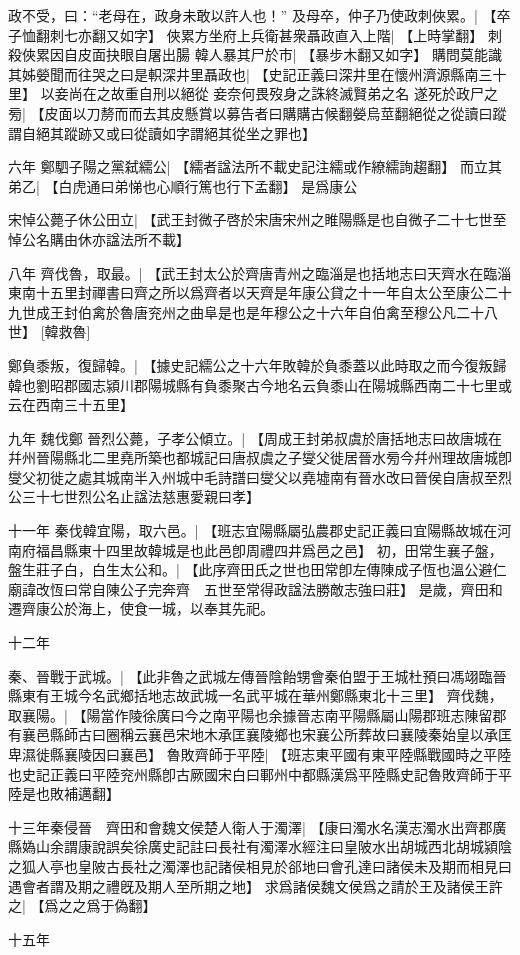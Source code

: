 政不受，曰：“老母在，政身未敢以許人也！”
及母卒，仲子乃使政刺俠累。|{
	【卒子恤翻刺七亦翻又如字】}
俠累方坐府上兵衛甚衆聶政直入上階|{
	【上時掌翻】}
刺殺俠累因自皮面抉眼自屠出腸
韓人暴其尸於市|{
	【暴步木翻又如字】}
購問莫能識
其姊嫈聞而往哭之曰是軹深井里聶政也|{
	【史記正義曰深井里在懷州濟源縣南三十里】}
以妾尚在之故重自刑以絕從
妾奈何畏歿身之誅終滅賢弟之名
遂死於政尸之㫄|{
	【皮面以刀剺而而去其皮懸賞以募告者曰購購古候翻嫈烏莖翻絕從之從讀曰蹤謂自絕其蹤跡又或曰從讀如字謂絕其從坐之罪也】
	}
\par 六年
鄭駟子陽之黨弑繻公|{
	【繻者諡法所不載史記注繻或作繚繻詢趨翻】}
而立其弟乙|{
	【白虎通曰弟悌也心順行篤也行下孟翻】}
是爲康公

宋悼公薨子休公田立|{
	【武王封微子啓於宋唐宋州之睢陽縣是也自微子二十七世至悼公名購由休亦諡法所不載】}
\par 八年
齊伐魯，取最。|{
	【武王封太公於齊唐青州之臨淄是也括地志曰天齊水在臨淄東南十五里封禪書曰齊之所以爲齊者以天齊是年康公貸之十一年自太公至康公二十九世成王封伯禽於魯唐兖州之曲阜是也是年穆公之十六年自伯禽至穆公凡二十八世】
	}
[韓救魯]

鄭負黍叛，復歸韓。|{
	【據史記繻公之十六年敗韓於負黍蓋以此時取之而今復叛歸韓也劉昭郡國志潁川郡陽城縣有負黍聚古今地名云負黍山在陽城縣西南二十七里或云在西南三十五里】}
\par 九年
魏伐鄭
晉烈公薨，子孝公傾立。|{
	【周成王封弟叔虞於唐括地志曰故唐城在幷州晉陽縣北二里堯所築也都城記曰唐叔虞之子燮父徙居晉水㫄今幷州理故唐城卽燮父初徙之處其城南半入州城中毛詩譜曰燮父以堯墟南有晉水改曰晉侯自唐叔至烈公三十七世烈公名止諡法慈惠愛親曰孝】}
\par 十一年
秦伐韓宜陽，取六邑。|{
	【班志宜陽縣屬弘農郡史記正義曰宜陽縣故城在河南府福昌縣東十四里故韓城是也此邑卽周禮四井爲邑之邑】}
初，田常生襄子盤，盤生莊子白，白生太公和。|{
	【此序齊田氏之世也田常卽左傳陳成子恆也溫公避仁廟諱改恆曰常自陳公子完奔齊　五世至常得政諡法勝敵志強曰莊】}
是歲，齊田和遷齊康公於海上，使食一城，以奉其先祀。
\par 十二年

秦、晉戰于武城。|{
	【此非魯之武城左傳晉陰飴甥會秦伯盟于王城杜預曰馮翊臨晉縣東有王城今名武鄉括地志故武城一名武平城在華州鄭縣東北十三里】}
齊伐魏，取襄陽。|{
	【陽當作陵徐廣曰今之南平陽也余據晉志南平陽縣屬山陽郡班志陳留郡有襄邑縣師古曰圈稱云襄邑宋地木承匡襄陵鄉也宋襄公所葬故曰襄陵秦始皇以承匡卑濕徙縣襄陵因曰襄邑】}
魯敗齊師于平陸|{
	【班志東平國有東平陸縣戰國時之平陸也史記正義曰平陸兖州縣卽古厥國宋白曰鄆州中都縣漢爲平陸縣史記魯敗齊師于平陸是也敗補邁翻】}
\par
十三年秦侵晉　齊田和會魏文侯楚人衛人于濁澤|{
	【康曰濁水名漢志濁水出齊郡廣縣媯山余謂康說誤矣徐廣史記註曰長社有濁澤水經注曰皇陂水出胡城西北胡城潁陰之狐人亭也皇陂古長社之濁澤也記諸侯相見於郤地曰會孔達曰諸侯未及期而相見曰遇會者謂及期之禮旣及期人至所期之地】}
求爲諸侯魏文侯爲之請於王及諸侯王許之|{
	【爲之之爲于偽翻】}
\par 十五年


